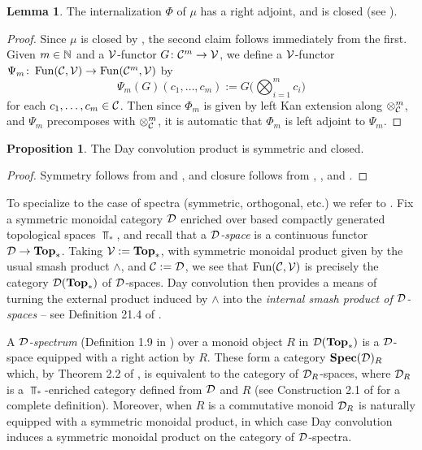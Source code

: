 \documentclass[openany, amssymb, psamsfonts]{amsart}
\theoremstyle{definition}
\newtheorem{prop}{Proposition}[section]
\newtheorem{lem}{Lemma}[section]
\numberwithin{equation}{section}
\begin{document}
\begin{lem}\label{lem:Day_internalization_closed}
The internalization $\Phi$ of $\mu$ has a right adjoint, and is closed (see ).
\end{lem}
\begin{proof}
Since $\mu$ is closed by , the second claim follows immediately from the first. Given $m \in \mathbb{N}$ and a $\mathcal{V}$-functor $G \colon \mathcal{C}^m \to \mathcal{V}$, we define a $\mathcal{V}$-functor $\Psi_m \colon \operatorname{Fun}(\mathcal{C}, \mathcal{V}) \to \operatorname{Fun}(\mathcal{C}^m, \mathcal{V})$ by
\begin{equation*}
    \Psi_m(G)(c_1, \dots, c_m) := G\Big(\bigotimes_{i = 1}^m c_i\Big)
\end{equation*} for each $c_1, \dots, c_m \in \mathcal{C}$. Then since $\Phi_m$ is given by left Kan extension along $\otimes_{\mathcal{C}}^m$, and $\Psi_m$ precomposes with $\otimes_{\mathcal{C}}^m$, it is automatic that $\Phi_m$ is left adjoint to $\Psi_m$.
\end{proof}

\begin{prop}
The Day convolution product is symmetric and closed.
\end{prop}
\begin{proof}
Symmetry follows from  and , and closure follows from , , and .
\end{proof}

To specialize to the case of spectra (symmetric, orthogonal, etc.) we refer to \cite{MMSS}. Fix a symmetric monoidal category $\mathcal{D}$ enriched over based compactly generated topological spaces $\Top_*$, and recall that a \emph{$\mathcal{D}$-space} is a continuous functor $\mathcal{D} \to \textbf{\textup{Top}}_*$. Taking $\mathcal{V} := \textbf{\textup{Top}}_*$, with symmetric monoidal product given by the usual smash product $\wedge$, and $\mathcal{C} := \mathcal{D}$, we see that $\operatorname{Fun}(\mathcal{C}, \mathcal{V})$ is precisely the category $\mathcal{D}(\textbf{\textup{Top}}_*)$ of $\mathcal{D}$-spaces. Day convolution then provides a means of turning the external product induced by $\wedge$ into the \emph{internal smash product of $\mathcal{D}$-spaces} -- see Definition 21.4 of \cite{MMSS}.

A \emph{$\mathcal{D}$-spectrum} (Definition 1.9 in \cite{MMSS}) over a monoid object $R$ in $\mathcal{D}(\textbf{\textup{Top}}_*)$ is a $\mathcal{D}$-space equipped with a right action by $R$. These form a category $\textbf{\textup{Spec}}(\mathcal{D})_R$ which, by Theorem 2.2 of \cite{MMSS}, is equivalent to the category of $\mathcal{D}_R$-spaces, where $\mathcal{D}_R$ is a $\Top_*$-enriched category defined from $\mathcal{D}$ and $R$ (see Construction 2.1 of \cite{MMSS} for a complete definition). Moreover, when $R$ is a commutative monoid $\mathcal{D}_R$ is naturally equipped with a symmetric monoidal product, in which case Day convolution induces a symmetric monoidal product on the category of $\mathcal{D}$-spectra.
\end{document}
